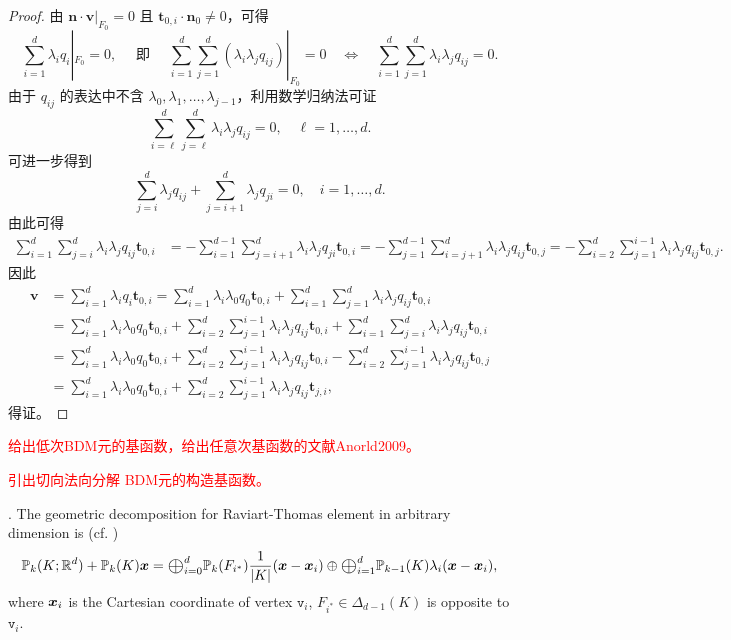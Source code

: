 \begin{proof}
由 $\boldsymbol n\cdot \boldsymbol v|_{F_0}=0$ 且 $\boldsymbol t_{0,i}\cdot \boldsymbol n_0\neq0$，可得
\[
\sum_{i=1}^{d} \lambda_i q_i|_{F_0} = 0,
\quad
\textrm{ 即 }
\quad
\sum_{i=1}^{d}\sum_{j=1}^{d}(\lambda_i \lambda_j q_{ij})|_{F_0} = 0 \quad\Leftrightarrow\quad \sum_{i=1}^{d}\sum_{j=1}^{d}\lambda_i \lambda_j q_{ij} = 0.
\]
由于 $q_{ij}$ 的表达中不含 $\lambda_0, \lambda_1, \ldots, \lambda_{j-1}$，利用数学归纳法可证
\[
\sum_{i=\ell}^{d}\sum_{j=\ell}^{d}\lambda_i \lambda_j q_{ij} = 0,\quad \ell=1,\dots,d.
\]
可进一步得到
\[
\sum_{j=i}^{d} \lambda_j q_{ij} + \sum_{j=i+1}^{d} \lambda_j q_{ji} = 0, \quad i=1,\dots,d.
\]
由此可得
\begin{align*}
\sum_{i=1}^{d}\sum_{j=i}^{d} \lambda_i \lambda_j q_{ij} \boldsymbol t_{0,i}
&= - \sum_{i=1}^{d-1}\sum_{j=i+1}^{d} \lambda_i \lambda_j q_{ji} \boldsymbol t_{0,i}
= - \sum_{j=1}^{d-1}\sum_{i=j+1}^{d} \lambda_i \lambda_j q_{ij} \boldsymbol t_{0,j} 
= - \sum_{i=2}^{d}\sum_{j=1}^{i-1} \lambda_i \lambda_j q_{ij} \boldsymbol t_{0,j}.
\end{align*}
因此
\begin{align*}
\boldsymbol v&=\sum_{i=1}^{d}\lambda_i q_i\boldsymbol t_{0,i} = \sum_{i=1}^{d}\lambda_i \lambda_{0}q_{0}\boldsymbol t_{0,i} + \sum_{i=1}^{d}\sum_{j=1}^{d}\lambda_i\lambda_jq_{ij}\boldsymbol t_{0,i} \\
&= \sum_{i=1}^{d}\lambda_i \lambda_{0}q_{0}\boldsymbol t_{0,i}
+ \sum_{i=2}^{d}\sum_{j=1}^{i-1}\lambda_i\lambda_jq_{ij}\boldsymbol t_{0,i} + \sum_{i=1}^{d}\sum_{j=i}^{d}\lambda_i\lambda_jq_{ij}\boldsymbol t_{0,i} \\
&= \sum_{i=1}^{d}\lambda_i \lambda_{0}q_{0}\boldsymbol t_{0,i}
+ \sum_{i=2}^{d}\sum_{j=1}^{i-1}\lambda_i\lambda_jq_{ij}\boldsymbol t_{0,i} -\sum_{i=2}^{d}\sum_{j=1}^{i-1}\lambda_i\lambda_jq_{ij}\boldsymbol t_{0,j} \\
&= \sum_{i=1}^{d}\lambda_i \lambda_{0}q_{0}\boldsymbol t_{0,i}
+ \sum_{i=2}^{d}\sum_{j=1}^{i-1}\lambda_i\lambda_jq_{ij}\boldsymbol t_{j,i},
\end{align*}
得证。
\end{proof}

\textcolor{red}{给出低次BDM元的基函数，给出任意次基函数的文献Anorld2009。}


\textcolor{red}{引出切向法向分解 BDM元的构造基函数。}


.
The geometric decomposition for Raviart-Thomas element in arbitrary dimension is (cf. \cite{ArnoldFalkWinther2009})
$$
\mathbb P_k(K;\mathbb R^d)+\mathbb P_k(K)\bs x=\Oplus_{i=0}^d\mathbb P_{k}(F_{i^*})\frac{1}{|K|}(\bs x-\bs x_i) \oplus \Oplus_{i=1}^d\mathbb P_{k-1}(K)\lambda_i(\bs x-\bs x_i),
$$
where $\boldsymbol x_i$ is the Cartesian coordinate of vertex $\texttt{v}_i$, $F_{i^*}\in\Delta_{d-1}(K)$ is opposite to $\texttt{v}_i$.



